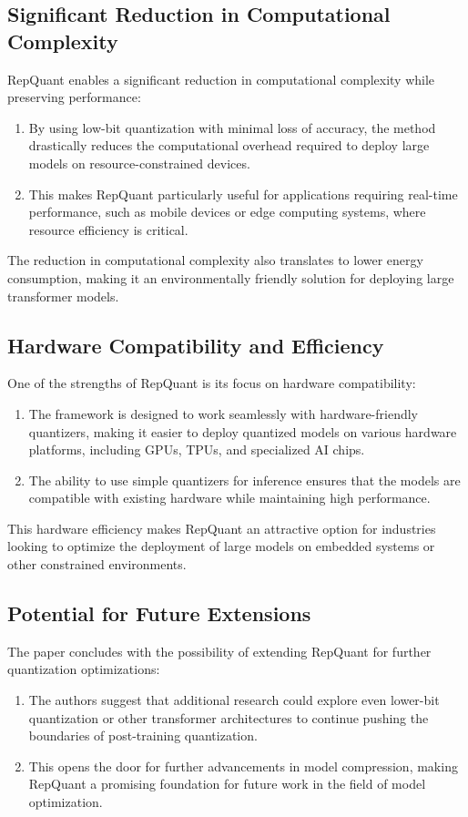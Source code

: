 \documentclass{report}
\begin{document}
	
	\subsection{Significant Reduction in Computational Complexity}
	RepQuant enables a significant reduction in computational complexity while preserving performance:
	\begin{enumerate}
		\item 
		By using low-bit quantization with minimal loss of accuracy, the method drastically reduces the computational overhead required to deploy large models on resource-constrained devices.
		
		\item 
		This makes RepQuant particularly useful for applications requiring real-time performance, such as mobile devices or edge computing systems, where resource efficiency is critical.
	\end{enumerate}
	The reduction in computational complexity also translates to lower energy consumption, making it an environmentally friendly solution for deploying large transformer models.
	
	\subsection{Hardware Compatibility and Efficiency}
	One of the strengths of RepQuant is its focus on hardware compatibility:
	\begin{enumerate}
		\item 
		The framework is designed to work seamlessly with hardware-friendly quantizers, making it easier to deploy quantized models on various hardware platforms, including GPUs, TPUs, and specialized AI chips.
		
		\item 
		The ability to use simple quantizers for inference ensures that the models are compatible with existing hardware while maintaining high performance.
	\end{enumerate}
	This hardware efficiency makes RepQuant an attractive option for industries looking to optimize the deployment of large models on embedded systems or other constrained environments.
	
	
	\subsection{Potential for Future Extensions}
	The paper concludes with the possibility of extending RepQuant for further quantization optimizations:
	\begin{enumerate}
		\item 
		The authors suggest that additional research could explore even lower-bit quantization or other transformer architectures to continue pushing the boundaries of post-training quantization.
		
		\item 
		This opens the door for further advancements in model compression, making RepQuant a promising foundation for future work in the field of model optimization.
	\end{enumerate}
	
\end{document}
